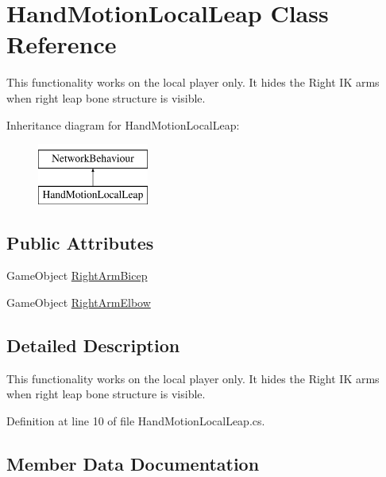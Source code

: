 \hypertarget{class_hand_motion_local_leap}{}\section{Hand\+Motion\+Local\+Leap Class Reference}
\label{class_hand_motion_local_leap}


This functionality works on the local player only. It hides the Right IK arms when right leap bone structure is visible.  


Inheritance diagram for Hand\+Motion\+Local\+Leap\+:\begin{figure}[H]
\begin{center}
\leavevmode
\includegraphics[height=2.000000cm]{class_hand_motion_local_leap}
\end{center}
\end{figure}
\subsection*{Public Attributes}
\begin{DoxyCompactItemize}
\item 
Game\+Object \mbox{\hyperlink{class_hand_motion_local_leap_a2d435b9bb3c1907d25c2a0dc5a2ec07f}{Right\+Arm\+Bicep}}
\item 
Game\+Object \mbox{\hyperlink{class_hand_motion_local_leap_a28df059b108d4b84273864b46842fc97}{Right\+Arm\+Elbow}}
\end{DoxyCompactItemize}


\subsection{Detailed Description}
This functionality works on the local player only. It hides the Right IK arms when right leap bone structure is visible. 



Definition at line 10 of file Hand\+Motion\+Local\+Leap.\+cs.



\subsection{Member Data Documentation}
\mbox{\label{class_hand_motion_local_leap_a2d435b9bb3c1907d25c2a0dc5a2ec07f}} 
